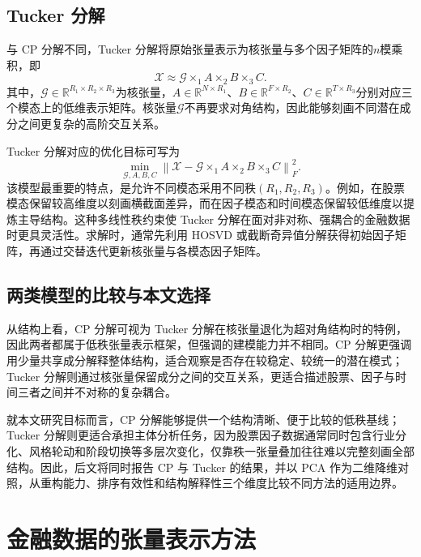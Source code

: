 \subsection{Tucker 分解}

与 CP 分解不同，Tucker 分解将原始张量表示为核张量与多个因子矩阵的$n$模乘积，即
\begin{equation}
\mathcal{X}\approx \mathcal{G}\times_1 A\times_2 B\times_3 C.
\end{equation}
其中，$\mathcal{G}\in\mathbb{R}^{R_1\times R_2\times R_3}$为核张量，$A\in\mathbb{R}^{N\times R_1}$、$B\in\mathbb{R}^{F\times R_2}$、$C\in\mathbb{R}^{T\times R_3}$分别对应三个模态上的低维表示矩阵。核张量$\mathcal{G}$不再要求对角结构，因此能够刻画不同潜在成分之间更复杂的高阶交互关系。

Tucker 分解对应的优化目标可写为
\begin{equation}
\min_{\mathcal{G},A,B,C}\left\|\mathcal{X}-\mathcal{G}\times_1 A\times_2 B\times_3 C\right\|_F^2.
\end{equation}
该模型最重要的特点，是允许不同模态采用不同秩$(R_1,R_2,R_3)$。例如，在股票模态保留较高维度以刻画横截面差异，而在因子模态和时间模态保留较低维度以提炼主导结构。这种多线性秩约束使 Tucker 分解在面对非对称、强耦合的金融数据时更具灵活性。求解时，通常先利用 HOSVD 或截断奇异值分解获得初始因子矩阵，再通过交替迭代更新核张量与各模态因子矩阵。

\subsection{两类模型的比较与本文选择}

从结构上看，CP 分解可视为 Tucker 分解在核张量退化为超对角结构时的特例，因此两者都属于低秩张量表示框架，但强调的建模能力并不相同。CP 分解更强调用少量共享成分解释整体结构，适合观察是否存在较稳定、较统一的潜在模式；Tucker 分解则通过核张量保留成分之间的交互关系，更适合描述股票、因子与时间三者之间并不对称的复杂耦合。

就本文研究目标而言，CP 分解能够提供一个结构清晰、便于比较的低秩基线；Tucker 分解则更适合承担主体分析任务，因为股票因子数据通常同时包含行业分化、风格轮动和阶段切换等多层次变化，仅靠秩一张量叠加往往难以完整刻画全部结构。因此，后文将同时报告 CP 与 Tucker 的结果，并以 PCA 作为二维降维对照，从重构能力、排序有效性和结构解释性三个维度比较不同方法的适用边界。

\section{金融数据的张量表示方法}

